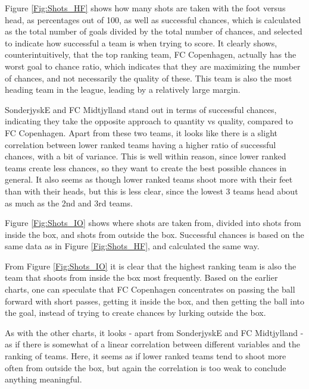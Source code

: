 \documentclass[Report.tex]{subfiles}
\begin{document}
Figure \ref{Fig:Shots_HF} shows how many shots are taken with the foot versus head, as
percentages out of 100, as well as successful chances, which is calculated as
the total number of goals divided by the total number of chances, and selected
to indicate how successful a team is when trying to score. 
It clearly shows, counterintuitively, that the top ranking team, FC Copenhagen,
actually has the worst goal to chance ratio, which indicates that they are
maximizing the number of chances, and not necessarily the quality of these. This
team is also the most heading team in the league, leading by a relatively large
margin. 

SonderjyskE and FC Midtjylland stand out in terms of successful chances,
indicating they take the opposite approach to quantity vs quality, compared to
FC Copenhagen. Apart from these two teams, it looks like there is a slight
correlation between lower ranked teams having a higher ratio of successful
chances, with a bit of variance. This is well within reason, since lower ranked
teams create less chances, so they want to create the best possible chances in
general. It also seems as though lower ranked teams shoot more with their feet
than with their heads, but this is less clear, since the lowest 3 teams head
about as much as the 2nd and 3rd teams. 

Figure \ref{Fig:Shots_IO} shows where shots are taken from, divided into shots from inside the
box, and shots from outside the box. Successful chances is based on the same
data as in Figure \ref{Fig:Shots_HF}, and calculated the same way. 

From Figure \ref{Fig:Shots_IO} it is clear that the highest ranking team is also the team that
shoots from inside the box most frequently. Based on the earlier charts, one can
speculate that FC Copenhagen concentrates on passing the ball forward with short
passes, getting it inside the box, and then getting the ball into the goal,
instead of trying to create chances by lurking outside the box. 

As with the other charts, it looks - apart from SonderjyskE and FC Midtjylland -
as if there is somewhat of a linear correlation between different variables and
the ranking of teams. Here, it seems as if lower ranked teams tend to shoot more
often from outside the box, but again the correlation is too weak to conclude
anything meaningful. 

	
\end{document}
